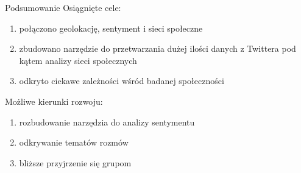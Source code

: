 \documentclass{beamer}
\begin{document}
\appendix
\begin{frame}{Podsumowanie}
Osiągnięte cele:
\begin{enumerate}
\item połączono geolokację, sentyment i sieci społeczne
\item zbudowano narzędzie do przetwarzania dużej ilości danych z Twittera pod
kątem analizy sieci społecznych
\item odkryto ciekawe zależności wśród badanej społeczności
\end{enumerate}
\vspace{0.5cm}
Możliwe kierunki rozwoju:
\begin{enumerate}
\item rozbudowanie narzędzia do analizy sentymentu
\item odkrywanie tematów rozmów
\item bliższe przyjrzenie się grupom
\end{enumerate} 
 
\end{frame} 
\end{document}
